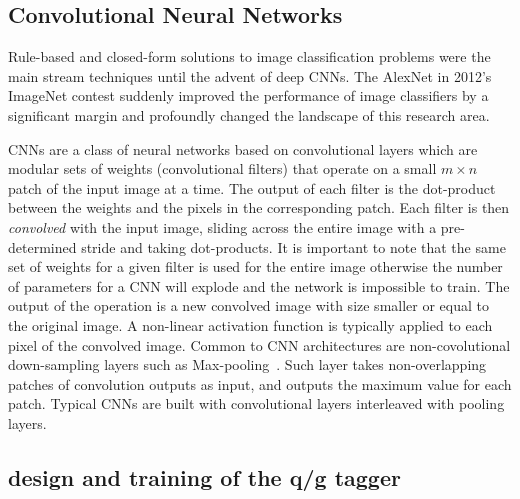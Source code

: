 \subsection{Convolutional Neural Networks}
\label{sec:cnn-cnn}

Rule-based and closed-form solutions to image classification problems were the main stream techniques until the advent of deep CNNs. The AlexNet in 2012's ImageNet contest suddenly improved the performance of image classifiers by a significant margin and profoundly changed the landscape of this research area.

CNNs are a class of neural networks based on convolutional layers which are modular sets of weights (convolutional filters) that operate on a small $m\times n$ patch of the input image at a time. The output of each filter is the dot-product between the weights and the pixels in the corresponding patch. Each filter is then \emph{convolved} with the input image, sliding across the entire image with a pre-determined stride and taking dot-products. It is important to note that the same set of weights for a given filter is used for the entire image otherwise the number of parameters for a CNN will explode and the network is impossible to train. The output of the operation is a new convolved image with size smaller or equal to the original image. A non-linear activation function is typically applied to each pixel of the convolved image.
Common to CNN architectures are non-covolutional down-sampling layers such as Max-pooling~\cite{MAXPOOL}.
Such layer takes non-overlapping patches of convolution outputs as input, and outputs the maximum value for each patch.
Typical CNNs are built with convolutional layers interleaved with pooling layers. 



\subsection{design and training of the q/g tagger}

